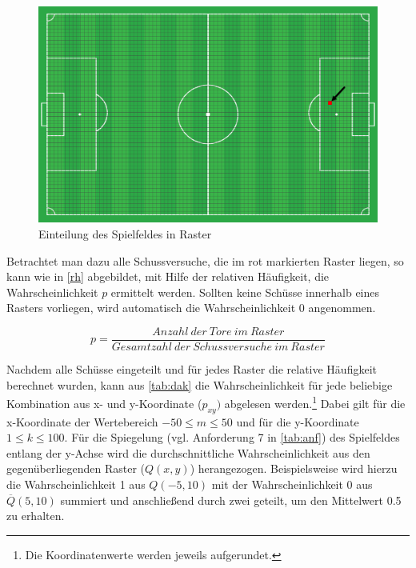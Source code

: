 \begin{figure}[H]
\centering
\includegraphics[scale=0.28]{se-wa-jpg/raster}
\caption[Einteilung des Spielfeldes in Raster]{Einteilung des Spielfeldes in Raster}
\label{raster}
\end{figure}

Betrachtet man dazu alle Schussversuche, die im rot markierten Raster liegen, so kann wie in \vref{rh} abgebildet, mit Hilfe der relativen Häufigkeit, die Wahrscheinlichkeit $p$ ermittelt werden. Sollten keine Schüsse innerhalb eines Rasters vorliegen, wird automatisch die Wahrscheinlichkeit 0 angenommen.

\begin{equation}
p = \frac{Anzahl~der~Tore~im~Raster}{Gesamtzahl~der~Schussversuche~im~Raster}
\label{rh}
\end{equation}

Nachdem alle Schüsse eingeteilt und für jedes Raster die relative Häufigkeit berechnet wurden, kann aus \vref{tab:dak} die Wahrscheinlichkeit für jede beliebige Kombination aus x- und y-Koordinate ($p_{xy})$ abgelesen werden.\footnote{Die Koordinatenwerte werden jeweils aufgerundet.} Dabei gilt für die x-Koordinate der Wertebereich $-50 \le m \le 50$ und für die y-Koordinate $1 \le k \le 100$. Für die Spiegelung (vgl. Anforderung 7 in \vref{tab:anf}) des Spielfeldes entlang der y-Achse wird die durchschnittliche Wahrscheinlichkeit aus den gegenüberliegenden Raster ($Q(x,y)$) herangezogen. Beispielsweise wird hierzu die Wahrscheinlichkeit \textsf{1} aus $Q(-5,10)$ mit der Wahrscheinlichkeit \textsf{0} aus $\overline{Q}(5,10)$ summiert und anschließend durch zwei geteilt, um den Mittelwert \textsf{0.5} zu erhalten. 


